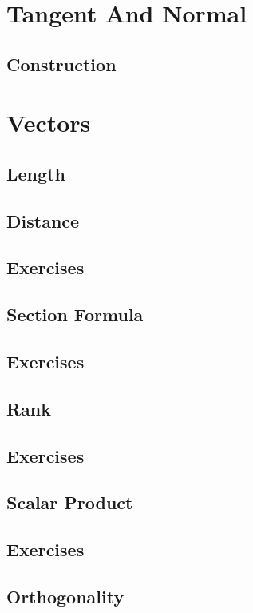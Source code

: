\documentclass[11pt]{book}
\begin{document}
\chapter{Tangent And Normal}

\section{Construction}
\iffalse
\chapter{Vectors}
\section{Length}

\section{Distance}

\section{Exercises}

\section{Section Formula}

\section{Exercises}

\section{Rank}

\section{Exercises}

\section{Scalar Product}

\section{Exercises}

\section{Orthogonality}

\end{document}
